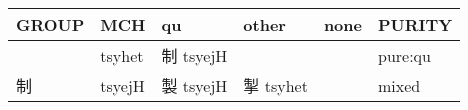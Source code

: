\documentclass[14pt,a4paper]{scrartcl}
\begin{document}
\begin{longtable}[c]{@{}llllll@{}}
\toprule
\begin{minipage}[b]{0.14\columnwidth}\raggedright\strut
GROUP
\strut\end{minipage} &
\begin{minipage}[b]{0.14\columnwidth}\raggedright\strut
MCH
\strut\end{minipage} &
\begin{minipage}[b]{0.14\columnwidth}\raggedright\strut
qu
\strut\end{minipage} &
\begin{minipage}[b]{0.14\columnwidth}\raggedright\strut
other
\strut\end{minipage} &
\begin{minipage}[b]{0.14\columnwidth}\raggedright\strut
none
\strut\end{minipage} &
\begin{minipage}[b]{0.14\columnwidth}\raggedright\strut
PURITY
\strut\end{minipage}\tabularnewline
\midrule
\endhead
\begin{minipage}[t]{0.14\columnwidth}\raggedright\strut
𠛐
\strut\end{minipage} &
\begin{minipage}[t]{0.14\columnwidth}\raggedright\strut
tsyhet
\strut\end{minipage} &
\begin{minipage}[t]{0.14\columnwidth}\raggedright\strut
制 tsyejH
\strut\end{minipage} &
\begin{minipage}[t]{0.14\columnwidth}\raggedright\strut
\strut\end{minipage} &
\begin{minipage}[t]{0.14\columnwidth}\raggedright\strut
\strut\end{minipage} &
\begin{minipage}[t]{0.14\columnwidth}\raggedright\strut
pure:qu
\strut\end{minipage}\tabularnewline
\begin{minipage}[t]{0.14\columnwidth}\raggedright\strut
制
\strut\end{minipage} &
\begin{minipage}[t]{0.14\columnwidth}\raggedright\strut
tsyejH
\strut\end{minipage} &
\begin{minipage}[t]{0.14\columnwidth}\raggedright\strut
製 tsyejH
\strut\end{minipage} &
\begin{minipage}[t]{0.14\columnwidth}\raggedright\strut
掣 tsyhet
\strut\end{minipage} &
\begin{minipage}[t]{0.14\columnwidth}\raggedright\strut
\strut\end{minipage} &
\begin{minipage}[t]{0.14\columnwidth}\raggedright\strut
mixed
\strut\end{minipage}\tabularnewline
\bottomrule
\end{longtable}
\end{document}

